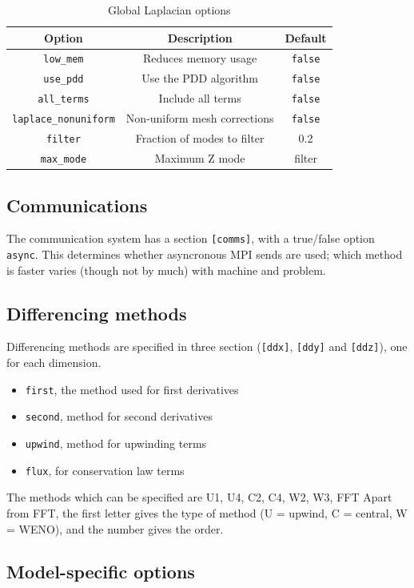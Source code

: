 \documentclass[12pt]{article}
\newcommand{\code}[1]{\texttt{#1}}
\begin{document}
\begin{table}[htbp!]
\caption{Global Laplacian options}
\label{tab:lapopts}
\centering
\begin{tabular}[c]{c c c}
\hline
Option & Description & Default \\
\hline
\texttt{low\_mem} & Reduces memory usage & \texttt{false} \\
\texttt{use\_pdd} & Use the PDD algorithm & \texttt{false} \\
\texttt{all\_terms} & Include all terms & \texttt{false} \\
\texttt{laplace\_nonuniform} & Non-uniform mesh corrections & \texttt{false} \\
\texttt{filter} & Fraction of modes to filter & 0.2 \\
\texttt{max\_mode} & Maximum Z mode & filter \\ 
\hline
\end{tabular}
\end{table}

\subsection{Communications}
The communication system has a section \code{[comms]}, with a true/false option \code{async}. This
determines whether asyncronous MPI sends are used; which method is faster varies (though not by much)
with machine and problem.

\subsection{Differencing methods}
\label{sec:diffmethodoptions}
Differencing methods are specified in three section (\code{[ddx]}, \code{[ddy]} and \code{[ddz]}), one
for each dimension. 
\begin{itemize}
\item \code{first}, the method used for first derivatives
\item \code{second}, method for second derivatives
\item \code{upwind}, method for upwinding terms
\item \code{flux}, for conservation law terms
\end{itemize}
The methods which can be specified are U1, U4, C2, C4, W2, W3, FFT
Apart from FFT, the first letter gives the type of method (U = upwind, C = central, W = WENO), and
the number gives the order.

\subsection{Model-specific options}
\end{document}
